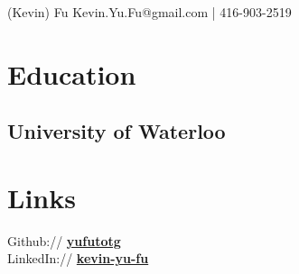 \documentclass[letterpaper]{kevin-resume} %
\begin{document}


 {(Kevin) Fu} { %
	Kevin.Yu.Fu@gmail.com | 416-903-2519 %
}


\begin{minipage}[t]{0.30\textwidth} %


\section{Education} 

\subsection{University of Waterloo}




\section{Links} 

Github:// \href{https://github.com/YuFuTotG} {\textbf{yufutotg}} \\
LinkedIn:// \href{https://ca.linkedin.com/in/kevin-yu-fu} {\textbf{kevin-yu-fu}} \\

\sectionspace %



\end{minipage}
\end{document}
